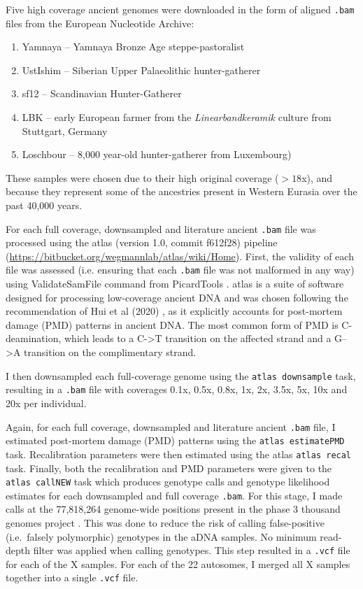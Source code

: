 {Five high coverage ancient genomes were downloaded in the form of aligned \texttt{.bam} files from the European Nucleotide Archive:

\begin{enumerate}
\item Yamnaya -- Yamnaya Bronze Age steppe-pastoralist \cite{deBarrosDamgaardeaar7711}
\item UstIshim -- Siberian Upper Palaeolithic hunter-gatherer \cite{Fu2014}
\item sf12 -- Scandinavian Hunter-Gatherer \cite{Gunther2018a}
\item LBK -- early European farmer from the \textit{Linearbandkeramik} culture from Stuttgart, Germany \cite{Lazaridis2014}
\item Loschbour -- 8,000 year-old hunter-gatherer from Luxembourg) \cite{Lazaridis2014}
\end{enumerate}

These samples were chosen due to their high original coverage ($>18$x), and because they represent some of the ancestries present in Western Eurasia over the past 40,000 years.  

For each full coverage, downsampled and literature ancient \texttt{.bam} file was processed using the atlas (version 1.0, commit f612f28) pipeline \cite{Link2017} \\(\url{https://bitbucket.org/wegmannlab/atlas/wiki/Home}). First, the validity of each file was assessed (i.e. ensuring that each \texttt{.bam} file was not malformed in any way) using ValidateSamFile command from PicardTools \cite{Picard2018toolkit}. atlas is a suite of software designed for processing low-coverage ancient DNA and was chosen following the recommendation of Hui et al (2020) \cite{hui2020evaluating}, as it explicitly accounts for post-mortem damage (PMD) patterns in ancient DNA. The most common form of PMD is C-deamination, which leads to a C->T transition on the affected strand and a G-->A transition on the complimentary strand.

I then downsampled each full-coverage genome using the \texttt{atlas downsample} task, resulting in a \texttt{.bam} file with coverages 0.1x, 0.5x, 0.8x, 1x, 2x, 3.5x, 5x, 10x and 20x per individual. 

Again, for each full coverage, downsampled and literature ancient \texttt{.bam} file, I estimated post-mortem damage (PMD) patterns using the \texttt{atlas estimatePMD} task. Recalibration parameters were then estimated using the atlas \texttt{atlas recal} task. Finally, both the recalibration and PMD parameters were given to the \texttt{atlas callNEW} task which produces genotype calls and genotype likelihood estimates for each downsampled and full coverage \texttt{.bam}. For this stage, I made calls at the 77,818,264 genome-wide positions present in the phase 3 thousand genomes project \cite{1000GenomesProjectConsortium2015}. This was done to reduce the risk of calling false-positive (i.e.\ falsely polymorphic) genotypes in the aDNA samples. No minimum read-depth filter was applied when calling genotypes. This step resulted in a \texttt{.vcf} file for each of the X samples. For each of the 22 autosomes, I merged all X samples together into a single \texttt{.vcf} file. 

}
